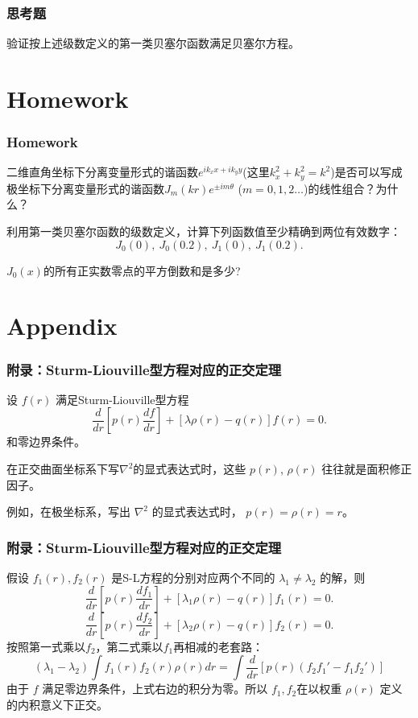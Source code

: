 \documentclass[CJK]{beamer}
\begin{document}
\begin{frame}
  \frametitle{思考题}
  

  
  验证按上述级数定义的第一类贝塞尔函数满足贝塞尔方程。
  
\end{frame}


\section{Homework}

\begin{frame}
  \frametitle{Homework}
  
  \bitem
\item{二维直角坐标下分离变量形式的谐函数$e^{ik_xx+ik_yy}$(这里$k_x^2+k_y^2=k^2$)是否可以写成极坐标下分离变量形式的谐函数$J_m(kr)e^{\pm im\theta}$ ($m=0,1,2\ldots$)的线性组合？为什么？}  
\item{利用第一类贝塞尔函数的级数定义，计算下列函数值至少精确到两位有效数字：  $$J_0(0),\ J_0(0.2),\ J_1(0),\ J_1(0.2).$$}
\item{$J_0(x)$的所有正实数零点的平方倒数和是多少?}  
  \eitem
  
\end{frame}

\section{Appendix}

\begin{frame}
  \frametitle{附录：Sturm-Liouville型方程对应的正交定理}
  设 $f(r)$ 满足Sturm-Liouville型方程
  $$\frac{d}{dr}\left[p(r)\frac{df}{dr}\right] + \left[\lambda\rho(r)-q(r)\right]f(r) = 0.$$
  和零边界条件。

  \skiplines
  
  在正交曲面坐标系下写$\nabla^2$的显式表达式时，这些 $p(r)$, $\rho(r)$ 往往就是面积修正因子。

  \skipline
  
  例如，在极坐标系，写出 $\nabla^2$ 的显式表达式时， $p(r) = \rho(r) = r$。  
\end{frame}

\begin{frame}
  \frametitle{附录：Sturm-Liouville型方程对应的正交定理}
  假设 $f_1(r), f_2(r)$ 是S-L方程的分别对应两个不同的 $\lambda_1\ne\lambda_2$ 的解，则
  $$\frac{d}{dr}\left[p(r)\frac{df_1}{dr}\right] + \left[\lambda_1\rho(r)-q(r)\right]f_1(r) = 0.$$
  $$\frac{d}{dr}\left[p(r)\frac{df_2}{dr}\right] + \left[\lambda_2\rho(r)-q(r)\right]f_2(r) = 0.$$    
  按照第一式乘以$f_2$，第二式乘以$f_1$再相减的老套路：
  $$ (\lambda_1-\lambda_2)\int f_1(r)f_2(r) \rho(r) dr =\int \frac{d}{dr}\left[p(r)\left(f_2f_1' - f_1 f_2'\right)\right] $$
  由于 $f$ 满足零边界条件，上式右边的积分为零。所以 $f_1, f_2$在以权重 $\rho(r)$ 定义的内积意义下正交。
\end{frame}
\end{document}

